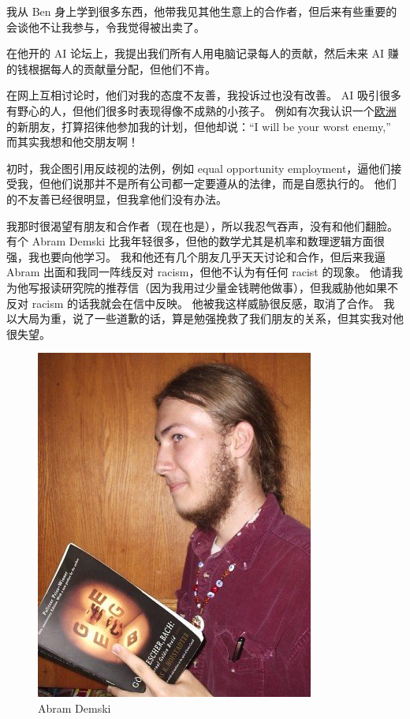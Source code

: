 \documentclass[12pt]{report}
\begin{document}
{我从 Ben 身上学到很多东西，他带我见其他生意上的合作者，但后来有些重要的会谈他不让我参与，令我觉得被出卖了。

在他开的 AI 论坛上，我提出我们所有人用电脑记录每人的贡献，然后未来 AI 赚的钱根据每人的贡献量分配，但他们不肯。

在网上互相讨论时，他们对我的态度不友善，我投诉过也没有改善。  AI 吸引很多有野心的人，但他们很多时表现得像不成熟的小孩子。  例如有次我认识一个\uline{欧洲}的新朋友，打算招徕他参加我的计划，但他却说：``I will be your worst enemy,'' 而其实我想和他交朋友啊！

初时，我企图引用反歧视的法例，例如 equal opportunity employment，逼他们接受我，但他们说那并不是所有公司都一定要遵从的法律，而是自愿执行的。 他们的不友善已经很明显，但我拿他们没有办法。

我那时很渴望有朋友和合作者（现在也是），所以我忍气吞声，没有和他们翻脸。 有个 Abram Demski 比我年轻很多，但他的数学尤其是机率和数理逻辑方面很强，我也要向他学习。 我和他还有几个朋友几乎天天讨论和合作，但后来我逼 Abram 出面和我同一阵线反对 racism，但他不认为有任何 racist 的现象。 他请我为他写报读研究院的推荐信（因为我用过少量金钱聘他做事），但我威胁他如果不反对 racism 的话我就会在信中反映。 他被我这样威胁很反感，取消了合作。 我以大局为重，说了一些道歉的话，算是勉强挽救了我们朋友的关系，但其实我对他很失望。

\begin{figure}[H]
\centering
\includegraphics[scale=0.4]{AbramDemski.jpg}
\caption*{Abram Demski}
\end{figure}

}
\end{document}
